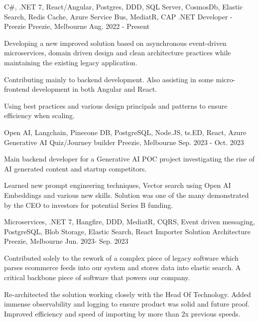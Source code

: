 

\vspace{-0.5\baselineskip}
\begin{cventries}
  \cventry
    {C\#, .NET 7, React/Angular, Postgres, DDD, SQL Server, CosmosDb, Elastic Search, Redis Cache, Azure Service Bus, MediatR, CAP}
    {.NET Developer - Preezie}
    {Preezie, Melbourne}
    {Aug. 2022 - Present}
    {
      \begin{cvitems}
        \item {Developing a new improved solution based on asynchronous event-driven microservices, domain driven design and clean architecture practices while maintaining the existing legacy application.}
        \item {Contributing mainly to backend development. Also assisting in some micro-frontend development in both Angular and React.}
        \item {Using best practices and various design principals and patterns to ensure efficiency when scaling.}
	  \end{cvitems}
    }
  \cventry
    {Open AI, Langchain, Pinecone DB, PostgreSQL, Node.JS, ts.ED, React, Azure}
    {Generative AI Quiz/Journey builder}
    {Preezie, Melbourne}
    {Sep. 2023 - Oct. 2023}
    {
      \begin{cvitems}
        \item {Main backend developer for a Generative AI POC project investigating the rise of AI generated content and startup competitors.}
        \item {Learned new prompt engineering techniques, Vector search using Open AI Embeddings and various new skills. Solution was one of the many demonstrated by the CEO to investors for potential Series B funding.}
      \end{cvitems}
    }
  \cventry
    {Microservices, .NET 7, Hangfire, DDD, MediatR, CQRS, Event driven messaging, PostgreSQL, Blob Storage, Elastic Search, React}
    {Importer Solution Architecture}
    {Preezie, Melbourne}
    {Jun. 2023- Sep. 2023}
    {
      \begin{cvitems}
        \item {Contributed solely to the rework of a complex piece of legacy software which parses ecommerce feeds into our system and stores data into elastic search. A critical backbone piece of software that powers our company.}
        \item {Re-architected the solution working closely with the Head Of Technology. Added immense observability and logging to ensure product was solid and future proof. Improved efficiency and speed of importing by more than 2x previous speeds.}

\end{cvitems}}
\end{cventries}
